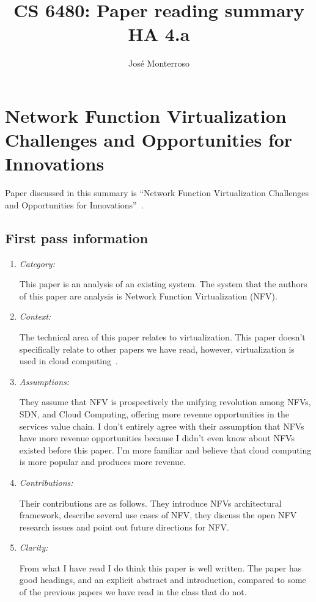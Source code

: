 \documentclass[letterpaper,twocolumn,10pt]{article}
\title{CS 6480: Paper reading summary\\
HA 4.a\\}
\author{José Monterroso}
\affil{School of Computing, University of Utah}
\begin{document}
\maketitle
\section{Network Function Virtualization Challenges and Opportunities for Innovations }

Paper discussed in this summary is ``Network Function Virtualization Challenges and Opportunities for Innovations''~\cite{nfv}.

\subsection{First pass information}
\label{sec:first}

\begin{enumerate}

\item {\it Category:} 

This paper is an analysis of an existing system. The system that the authors of this paper are analysis is Network 
Function Virtualization (NFV). 

\item {\it Context:} 

The technical area of this paper relates to virtualization. This paper doesn't specifically relate to other papers we
have read, however, virtualization is used in cloud computing~\cite{containerization,aview}. 

\item {\it Assumptions:}  

They assume that NFV is prospectively the unifying revolution among NFVs, SDN, and Cloud Computing, 
offering more revenue opportunities in the services value chain. I don't entirely agree with their assumption
that NFVs have more revenue opportunities because I didn't even know about NFVs existed before this paper.
I'm more familiar and believe that cloud computing is more popular and produces more revenue. 

\item {\it Contributions:} 

Their contributions are as follows. They introduce NFVs architectural framework, describe several use cases of NFV, 
they discuss the open NFV research issues and point out future directions for NFV.

\item {\it Clarity:} 

From what I have read I do think this paper is well written. The paper has good headings, and an explicit abstract and 
introduction, compared to some of the previous papers we have read in the class that do not.  

\end{enumerate}
\end{document}
